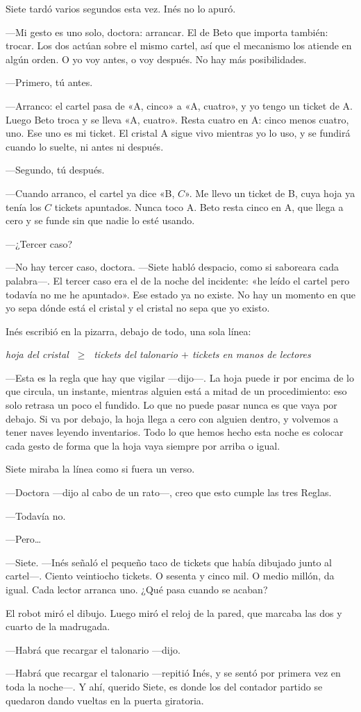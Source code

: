 Siete tardó varios segundos esta vez. Inés no lo apuró.

---Mi gesto es uno solo, doctora: arrancar. El de Beto que importa también: trocar. Los dos actúan sobre el mismo cartel, así que el mecanismo los atiende en algún orden. O yo voy antes, o voy después. No hay más posibilidades.

---Primero, tú antes.

---Arranco: el cartel pasa de «A, cinco» a «A, cuatro», y yo tengo un ticket de A. Luego Beto troca y se lleva «A, cuatro». Resta cuatro en A: cinco menos cuatro, uno. Ese uno es mi ticket. El cristal A sigue vivo mientras yo lo uso, y se fundirá cuando lo suelte, ni antes ni después.

---Segundo, tú después.

---Cuando arranco, el cartel ya dice «B, $C$». Me llevo un ticket de B, cuya hoja ya tenía los $C$ tickets apuntados. Nunca toco A. Beto resta cinco en A, que llega a cero y se funde sin que nadie lo esté usando.

---¿Tercer caso?

---No hay tercer caso, doctora. ---Siete habló despacio, como si saboreara cada palabra---\nobreak. El tercer caso era el de la noche del incidente: «he leído el cartel pero todavía no me he apuntado». Ese estado ya no existe. No hay un momento en que yo sepa dónde está el cristal y el cristal no sepa que yo existo.

Inés escribió en la pizarra, debajo de todo, una sola línea:

\begin{center}
\emph{hoja del cristal $\;\geq\;$ tickets del talonario $+$ tickets en manos de lectores}
\end{center}

---Esta es la regla que hay que vigilar ---dijo---\nobreak. La hoja puede ir por encima de lo que circula, un instante, mientras alguien está a mitad de un procedimiento: eso solo retrasa un poco el fundido. Lo que no puede pasar nunca es que vaya por debajo. Si va por debajo, la hoja llega a cero con alguien dentro, y volvemos a tener naves leyendo inventarios. Todo lo que hemos hecho esta noche es colocar cada gesto de forma que la hoja vaya siempre por arriba o igual.

Siete miraba la línea como si fuera un verso.

---Doctora ---dijo al cabo de un rato---\nobreak, creo que esto cumple las tres Reglas.

---Todavía no.

---Pero\ldots

---Siete. ---Inés señaló el pequeño taco de tickets que había dibujado junto al cartel---\nobreak. Ciento veintiocho tickets. O sesenta y cinco mil. O medio millón, da igual. Cada lector arranca uno. ¿Qué pasa cuando se acaban?

El robot miró el dibujo. Luego miró el reloj de la pared, que marcaba las dos y cuarto de la madrugada.

---Habrá que recargar el talonario ---dijo.

---Habrá que recargar el talonario ---repitió Inés, y se sentó por primera vez en toda la noche---\nobreak. Y ahí, querido Siete, es donde los del contador partido se quedaron dando vueltas en la puerta giratoria.
